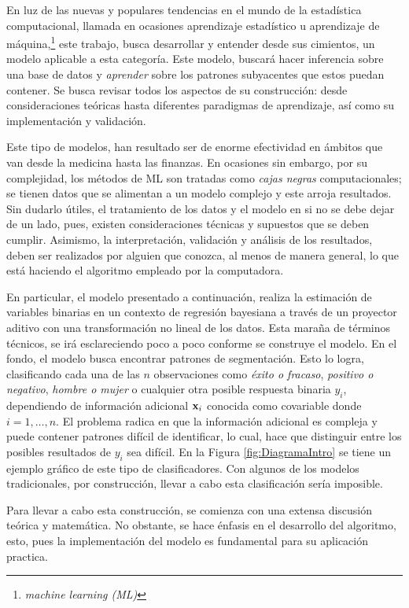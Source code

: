 \documentclass[../Main/Main.tex]{subfiles}
\begin{document}
En luz de las nuevas y populares tendencias en el mundo de la estadística computacional, llamada en ocasiones aprendizaje estadístico u aprendizaje de máquina,\footnote{\textit{machine learning (ML)}} este trabajo, busca desarrollar y entender desde sus cimientos, un modelo aplicable a esta categoría. Este modelo, buscará hacer inferencia sobre una base de datos y \textit{aprender} sobre los patrones subyacentes que estos puedan contener. Se busca revisar todos los aspectos de su construcción: desde consideraciones teóricas hasta diferentes paradigmas de aprendizaje, así como su implementación y validación.

Este tipo de modelos, han resultado ser de enorme efectividad en  ámbitos que van desde la medicina hasta las finanzas. En ocasiones sin embargo, por su complejidad, los métodos de ML son tratadas como \textit{cajas negras} computacionales; se tienen datos que se alimentan a un modelo complejo y este arroja resultados. Sin dudarlo útiles, el tratamiento de los datos y el modelo en si no se debe dejar de un lado, pues, existen consideraciones técnicas y supuestos que se deben cumplir. Asimismo, la interpretación, validación y análisis de los resultados, deben ser realizados por alguien que conozca, al menos de manera general, lo que está haciendo el algoritmo empleado por la computadora.

En particular, el modelo presentado a continuación, realiza la estimación de variables binarias en un contexto de regresión bayesiana a través de un proyector aditivo con una transformación no lineal de los datos. Esta maraña de términos técnicos, se irá esclareciendo poco a poco conforme se construye el modelo. En el fondo, el modelo busca encontrar patrones de segmentación. Esto lo logra, clasificando cada una de las $n$ observaciones como \textit{éxito o fracaso}, \textit{positivo o negativo}, \textit{hombre o mujer} o cualquier otra posible respuesta binaria $y_i$, dependiendo de información adicional $\mathbf{x}_i$ conocida como covariable donde $i = 1,\ldots,n$. El problema radica en que la información adicional es compleja y puede contener patrones difícil de identificar, lo cual, hace que distinguir entre los posibles resultados de $y_i$ sea difícil.  En la Figura \ref{fig:DiagramaIntro} se tiene un ejemplo gráfico de este tipo de clasificadores. Con algunos de los modelos tradicionales, por construcción, llevar a cabo esta clasificación sería imposible.

Para llevar a cabo esta construcción, se comienza con una extensa discusión teórica y matemática. No obstante, se hace énfasis en el desarrollo del algoritmo, esto, pues la implementación del modelo es fundamental para su aplicación practica.
\end{document}
